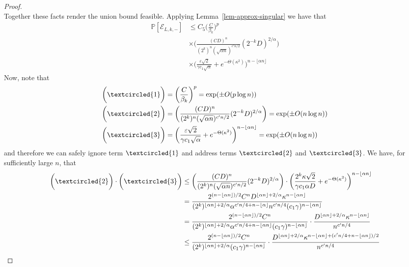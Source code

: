 \documentclass[11pt]{article}
\numberwithin{equation}{section}
\theoremstyle{remark}
\newcommand{\event}{\mathcal{E}}
\begin{document}
\begin{proof}
\begin{equation*}
    \end{equation*}
    Together these facts render the union bound feasible. Applying Lemma~\ref{lem-approx-singular} we have that
    \begin{align*}
        \mathbb{P}[\event_{L, k, -}] &\leq  C_5 \bigg(\frac{C}{\beta_{k}}\bigg)^p  \\
        &\times \bigg(\frac{(CD)^n}{(2^k)^n(\sqrt{\alpha n})^{c'n/2}}(2^{-k}D)^{2/\alpha}\bigg) \\
        &\times \bigg(\frac{\varepsilon\sqrt{2}}{\gamma c_{1} \sqrt{\alpha}} + e^{-\Theta(\kappa^2)} \bigg)^{n - \lfloor \alpha n \rfloor}
    \end{align*}
    Now, note that
    \begin{align*}
        \bigg(\textcircled{1} \bigg) &=  \bigg(\frac{C}{\beta_{k}}\bigg)^p = \exp(\pm O(p \log n)) \\
        \bigg(\textcircled{2} \bigg) &=  \bigg(\frac{(CD)^n}{(2^k)^n(\sqrt{\alpha n})^{c'n/2}}(2^{-k}D)^{2/\alpha}\bigg) = \exp(\pm O(n \log n)) \\
        \bigg(\textcircled{3} \bigg) &= \bigg(\frac{\varepsilon\sqrt{2}}{\gamma c_{1} \sqrt{\alpha}} + e^{-\Theta(\kappa^2)} \bigg)^{n - \lfloor \alpha n \rfloor} = \exp(\pm O(n \log n))
    \end{align*}
    and therefore we can safely ignore term $\textcircled{1}$ and address terms $\textcircled{2}$ and $\textcircled{3}$. We have, for sufficiently large $n$, that
    \begin{align*}
        \bigg(\textcircled{2} \bigg) \cdot \bigg(\textcircled{3} \bigg) &\leq \bigg(\frac{(CD)^n}{(2^k)^n(\sqrt{\alpha n})^{c'n/2}}(2^{-k}D)^{2/\alpha}\bigg) \cdot \bigg(\frac{2^k \kappa \sqrt{2}}{\gamma c_{1} \alpha D} + e^{-\Theta(\kappa^2)} \bigg)^{n - \lfloor \alpha n \rfloor} \\
        &= \frac{2^{(n - \lfloor \alpha n \rfloor)/2}C^n D^{\lfloor \alpha n \rfloor  + 2/\alpha}\kappa^{n - \lfloor \alpha n \rfloor}}{(2^k)^{\lfloor \alpha n \rfloor + 2/\alpha}\alpha^{c'n/4 + n - \lfloor \alpha \rfloor}n^{c'n/4}(c_1\gamma)^{n - \lfloor \alpha n \rfloor}} \\
        &= \frac{2^{(n - \lfloor \alpha n \rfloor)/2}C^n}{(2^k)^{\lfloor \alpha n \rfloor + 2/\alpha}\alpha^{c'n/4 + n - \lfloor \alpha n \rfloor}(c_1\gamma)^{n - \lfloor \alpha n \rfloor}}  \cdot \frac{D^{\lfloor \alpha n \rfloor  + 2/\alpha}\kappa^{n - \lfloor \alpha n \rfloor}}{n^{c'n/4}} \\
        &\leq \frac{2^{(n - \lfloor \alpha n \rfloor)/2}C^n}{(2^k)^{\lfloor \alpha n \rfloor + 2/\alpha}(c_1\gamma)^{n - \lfloor \alpha n \rfloor}}  \cdot \frac{D^{\lfloor \alpha n \rfloor  + 2/\alpha}\kappa^{n - \lfloor \alpha n \rfloor + (c'n/4 + n - \lfloor \alpha n \rfloor)/2}}{n^{c'n/4}} \\

\end{align*}
\end{proof}
\end{document}
